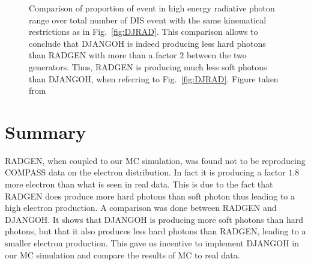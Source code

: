 \begin{figure}[htb]
\centerline{}
\caption{Comparison of proportion of event in high energy radiative photon range over total number of DIS event with the same kinematical restrictions as in Fig.~\ref{fig:DJRAD}. This comparison allows to conclude that DJANGOH is indeed producing less hard photons than RADGEN with more than a factor $2$ between the two generators. Thus, RADGEN is producing much less soft photons than DJANGOH, when referring to Fig.~\ref{fig:DJRAD}. Figure taken from \cite{DJANGOHnote}}\label{fig:tabDJRAD}
\end{figure}

\newpage


\section{Summary}

RADGEN, when coupled to our MC simulation, was found not to be reproducing COMPASS data on the electron distribution. In fact it is producing a factor $1.8$ more electron than what is seen in real data. This is due to the fact that RADGEN does produce more hard photons than soft photon thus leading to a high electron production. A comparison was done between RADGEN and DJANGOH. It shows that DJANGOH is producing more soft photons than hard photons, but that it also produces less hard photons than RADGEN, leading to a smaller electron production. This gave us incentive to implement DJANGOH in our MC simulation and compare the results of MC to real data.
